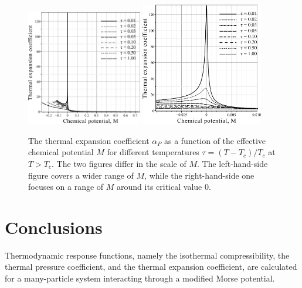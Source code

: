\documentclass[12pt]{article}
\begin{document}
		\begin{figure}[h!]
		\centering \includegraphics[width=0.45\textwidth]{f4b.pdf}
		\includegraphics[width=0.475\textwidth]{f4c.pdf}
		\vskip-3mm\caption{The thermal expansion coefficient $\alpha_P$ as a function of the effective chemical potential $M$ for different temperatures $\tau = (T - T_c)/T_c$ at $T > T_c$. The two figures differ in the scale of $M$. The left-hand-side figure covers a wider range of $M$, while the right-hand-side one focuses on a range of $M$ around its critical value $0$.
		}\label{fig4b}
	\end{figure}
	
	\newpage 
	
	\section{Conclusions}
	Thermodynamic response functions, namely the isothermal compressibility, the thermal pressure coefficient, and the thermal expansion coefficient, are calculated for a many-particle system interacting through a modified Morse potential.
	
	
	
	
\end{document}
